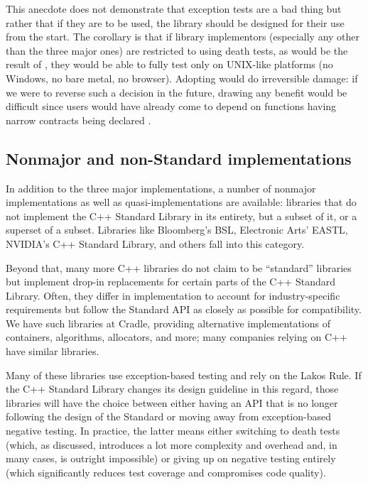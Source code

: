 This anecdote does not demonstrate that exception tests are a bad thing but rather that if they are to be used, the library should be designed for their use from the start. The corollary is that if library implementors (especially any other than the three major ones) are restricted to using death tests, as would be the result of \cite{P1656R2}, they would be able to fully test only on UNIX-like platforms (no Windows, no bare metal, no browser). Adopting \cite{P1656R2} would do irreversible damage: if we were to reverse such a decision in the future, drawing any benefit would be difficult since users would have already come to depend on functions having narrow contracts being declared .

\subsection{Nonmajor and non-Standard implementations}

In addition to the three major implementations, a number of nonmajor implementations as well as quasi-implementations are available: libraries that do not implement the C++ Standard Library in its entirety, but a subset of it, or a superset of a subset. Libraries like Bloomberg's BSL, Electronic Arts' EASTL, NVIDIA's C++ Standard Library, and others fall into this category.

Beyond that, many more C++ libraries do not claim to be ``standard'' libraries but implement drop-in replacements for certain parts of the C++ Standard Library. Often, they differ in implementation to account for industry-specific requirements but follow the Standard API as closely as possible for compatibility. We have such libraries at Cradle, providing alternative implementations of containers, algorithms, allocators, and more; many companies relying on C++ have similar libraries.

Many of these libraries use exception-based testing and rely on the Lakos Rule. If the C++ Standard Library changes its design guideline in this regard, those libraries will have the choice between either having an API that is no longer following the design of the Standard or moving away from exception-based negative testing. In practice, the latter means either switching to death tests (which, as discussed, introduces a lot more complexity and overhead and, in many cases, is outright impossible) or giving up on negative testing entirely (which significantly reduces test coverage and compromises code quality).

